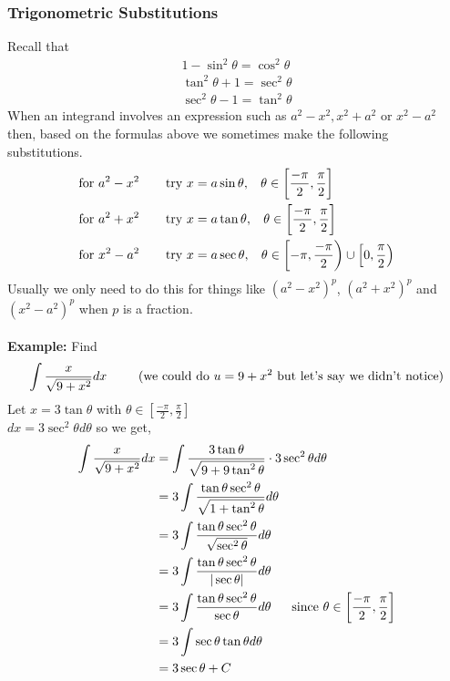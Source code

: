 \documentclass[10pt]{article}
\theoremstyle{break}
\begin{document}
\subsubsection{Trigonometric Substitutions}
Recall that 
\begin{align*}
  1 - \sin^2\theta = \cos^2 \theta\\
  \tan^2 \theta + 1 = \sec^2 \theta\\
  \sec^2\theta - 1 = \tan^2 \theta
\end{align*}
When an integrand involves an expression such as $a^2 - x^2, x^2 + a^2$ or $x^2 - a^2$ then, based on the formulas
above we sometimes make the following substitutions.
\begin{align*}
  \text{for } a^2 - x^2 \hspace{4ex} &\text{ try } x = a\sin \theta, \hspace{2ex} \theta \in \left[\frac{-\pi}{2},\dfrac{\pi}{2} \right]\\
  \text{for } a^2 + x^2 \hspace{4ex} &\text{ try } x = a\tan \theta, \hspace{2ex} \theta \in \left[\frac{-\pi}{2},\dfrac{\pi}{2} \right]\\
  \text{for } x^2 - a^2 \hspace{4ex} &\text{ try } x = a\sec \theta, \hspace{2ex} \theta \in \left[{-\pi},\dfrac{-\pi}{2} \right) \cup \left[0,\dfrac{\pi}{2} \right)\\
\end{align*}
Usually we only need to do this for things like $(a^2 - x^2)^p$, $(a^2 + x^2)^p$ and $(x^2 - a^2)^p$ when $p$ is a fraction.
\\ \vspace{0.5ex} \\
\textbf{Example:} Find
$$\int \dfrac{x}{\sqrt{9 + x^2}} dx \hspace{5ex} \text{ (we could do } u = 9 + x^2 \text{ but let's say we didn't notice)}$$
Let $x = 3 \tan\theta$ with $\theta \in \left[\frac{-\pi}{2},\frac{\pi}{2} \right]$\\
$dx = 3 \sec^2 \theta d \theta$
so we get, 
\begin{align*}
  \int \dfrac{x}{\sqrt{9 + x^2}} dx &= \int \dfrac{3 \tan \theta}{\sqrt{9 + 9 \tan^2 \theta}}\cdot 3\sec^2 \theta d \theta\\
  &= 3  \int \dfrac{\tan \theta \sec^2 \theta}{\sqrt{1 + \tan^2 \theta}} d \theta\\
  &= 3  \int \dfrac{\tan \theta \sec^2 \theta}{\sqrt{\sec^2 \theta}} d \theta\\
  &= 3  \int \dfrac{\tan \theta \sec^2 \theta}{|\sec \theta|} d \theta\\
  &= 3  \int \dfrac{\tan \theta \sec^2 \theta}{\sec \theta} d \theta \hspace{3ex} \text{ since } \theta \in \left[\frac{-\pi}{2},\frac{\pi}{2} \right]\\
  &= 3 \int \sec \theta \tan \theta d \theta\\
  &= 3 \sec \theta + C
\end{align*}
\end{document}

